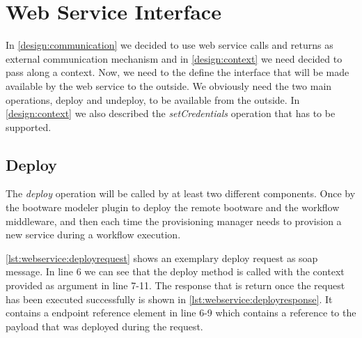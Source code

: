 \section{Web Service Interface}
\label{implementation:webservice}

In \autoref{design:communication} we decided to use web service calls and returns as external communication mechanism and in \autoref{design:context} we need decided to pass along a context.
Now, we need to the define the interface that will be made available by the web service to the outside.
We obviously need the two main operations, deploy and undeploy, to be available from the outside.
In \autoref{design:context} we also described the \textit{setCredentials} operation that has to be supported.

\subsection{Deploy}

The \textit{deploy} operation will be called by at least two different components.
Once by the bootware modeler plugin to deploy the remote bootware and the workflow middleware, and then each time the provisioning manager needs to provision a new service during a workflow execution.

\vspace*{\baselineskip}

\autoref{lst:webservice:deployrequest} shows an exemplary deploy request as soap message.
In line 6 we can see that the deploy method is called with the context provided as argument in line 7-11.
The response that is return once the request has been executed successfully is shown in \autoref{lst:webservice:deployresponse}.
It contains a endpoint reference element in line 6-9 which contains a reference to the payload that was deployed during the request.

\vspace*{\baselineskip}

